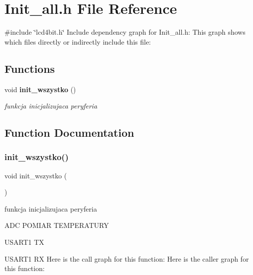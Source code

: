 \section{Init\+\_\+all.\+h File Reference}
\label{_init__all_8h}
{\ttfamily \#include \char`\"{}lcd4bit.\+h\char`\"{}}\newline
Include dependency graph for Init\+\_\+all.\+h\+:
This graph shows which files directly or indirectly include this file\+:
\subsection*{Functions}
\begin{DoxyCompactItemize}
\item 
void \textbf{ init\+\_\+wszystko} ()
\begin{DoxyCompactList}\small\item\em funkcja inicjalizujaca peryferia \end{DoxyCompactList}\end{DoxyCompactItemize}


\subsection{Function Documentation}
\mbox{\label{_init__all_8h_acdbbebf8dc17d0b9825a2608b3108183}} 
\subsubsection{init\+\_\+wszystko()}
{\footnotesize\ttfamily void init\+\_\+wszystko (\begin{DoxyParamCaption}{ }\end{DoxyParamCaption})}



funkcja inicjalizujaca peryferia 

A\+DC P\+O\+M\+I\+AR T\+E\+M\+P\+E\+R\+A\+T\+U\+RY

U\+S\+A\+R\+T1 TX

U\+S\+A\+R\+T1 RX Here is the call graph for this function\+:
Here is the caller graph for this function\+:
